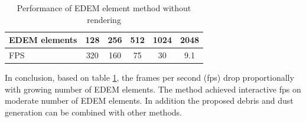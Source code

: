 \begin{table}[ht!]
    \begin{center}
  \begin{tabular}{ |l|c|c|c|c|c| } 
  \hline
  EDEM elements & 128 & 256 & 512 & 1024 & 2048 \\ 
  \hline
  FPS & 320 & 160 & 75 & 30 & 9.1 \\ 
  \hline
  
  \end{tabular}
  \end{center}
  \caption{Performance of EDEM element method without rendering \cite{edem}}
  \label{table1}
\end{table}
In conclusion, based on table \ref{table1}, the frames per second (fps) drop proportionally with growing number of EDEM elements. The method achieved interactive fps on moderate number of EDEM elements. In addition the proposed debris and dust generation can be combined with other methods.


